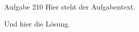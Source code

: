 \begin{exercise}{Aufgabe 2}{10}
  Hier steht der Aufgabentext.
\end{exercise}

\begin{solution}
  Und hier die Lösung.
\end{solution}
